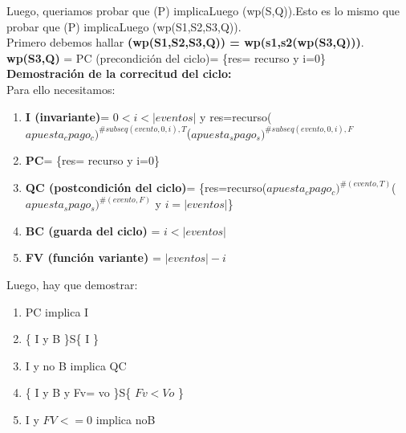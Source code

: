 \documentclass[10pt,a4paper]{article}
\begin{document}
\begin{flushleft}
\vspace{3mm}
Luego, queriamos probar que (P) implicaLuego (wp(S,Q)).Esto es lo mismo que probar que (P) implicaLuego (wp(S1,S2,S3,Q)).\\
\vspace{3mm}
Primero debemos hallar \textbf{(wp(S1,S2,S3,Q)) = wp(s1,s2(wp(S3,Q)))}.\\
\vspace{3mm}
\textbf{wp(S3,Q)} = PC (precondición del ciclo)= \{res= recurso y i=0\}\\
\vspace{3mm}
\textbf{Demostración de la correcitud del ciclo:}\\
\vspace{3mm}
Para ello necesitamos: 
\begin{enumerate} \setlength\itemsep{0cm}
	\item \textbf{I (invariante)}= $0<i<|eventos|$ y res=recurso($apuesta_cpago_c)^{\#subseq(evento,0,i),T}$($apuesta_spago_s)^{\#subseq(evento,0,i),F}$
	\item \textbf{PC}= \{res= recurso y i=0\}
	\item \textbf{QC (postcondición del ciclo)}= \{res=recurso($apuesta_cpago_c)^{\#(evento,T)}$($apuesta_spago_s)^{\#(evento,F)}$ y $i=|eventos|$\}
	\item \textbf{BC (guarda del ciclo)} = $i < |eventos|$
	\item \textbf{FV (función variante)} = $|eventos|-i$
\end{enumerate}

Luego, hay que demostrar:
\begin{enumerate} \setlength\itemsep{0cm}
	\item PC implica I
	\item \{ I y B \}S\{ I \}
	\item I y no B implica QC
	\item \{ I y B  y Fv= vo \}S\{ $Fv<Vo$ \}
	\item I y $FV<=0$ implica noB
\end{enumerate}


\end{flushleft}
\end{document}

